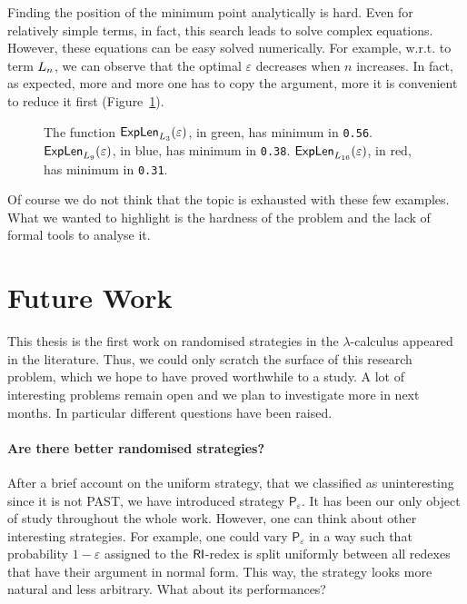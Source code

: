 Finding the position of the minimum point analytically is hard. Even for relatively simple terms, in fact, this search leads to solve complex equations. However, these equations can be easy solved numerically. For example, w.r.t. to term $L_n$, we can observe that the optimal $\varepsilon$ decreases when $n$ increases. In fact, as expected, more and more one has to copy the argument, more it is convenient to reduce it first (Figure~\ref{figure:plot3}).
\begin{figure}
		\caption[The function $\explen{\termthree_3}(\varepsilon)$.]{The function $\explen{\termthree_3}(\varepsilon)$, in green, has minimum in \texttt{0.56}. $\textsf{ExpLen}_{L_9}(\varepsilon)$, in blue, has minimum in \texttt{0.38}. $\textsf{ExpLen}_{L_{16}}(\varepsilon)$, in red, has minimum in \texttt{0.31}.}
		\label{figure:plot3}
	\end{figure}
	 Of course we do not think that the topic is exhausted with these few examples. What we wanted to highlight is the hardness of the problem and the lack of formal tools to analyse it.
\section{Future Work}
This thesis is the first work on randomised strategies in the $\lambda$-calculus appeared in the literature. Thus, we could only scratch the surface of this research problem, which we hope to have proved worthwhile to a study. A lot of interesting problems remain open and we plan to investigate more in next months. In particular different questions have been raised.
\paragraph{Are there better randomised strategies?} After a brief account on the uniform strategy, that we classified as uninteresting since it is not PAST, we have introduced strategy $\mathsf{P}_\varepsilon$. It has been our only object of study throughout the whole work. However, one can think about other interesting strategies. For example, one could vary $\mathsf{P}_\varepsilon$ in a way such that probability $1-\varepsilon$ assigned to the $\textsf{RI}$-redex is split uniformly between all redexes that have their argument in normal form. This way, the strategy looks more natural and less arbitrary. What about its performances?
